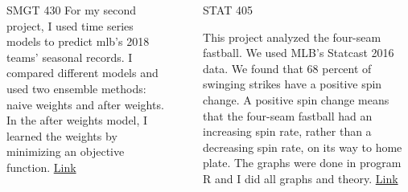 \documentclass[final]{beamer}
\newlength{\sepwid}
\newlength{\onecolwid}
\newlength{\twocolwid}
\begin{document}
\begin{frame}[t]
\begin{columns}[t]
\begin{column}{\onecolwid}
\begin{block}{SMGT 430}
For my second project, I used time series models to predict mlb's 2018 teams' seasonal records. I compared different models and used two ensemble methods: naive weights and after weights. In the after weights model, I learned the weights by minimizing an objective function. 
\href{https://www.dropbox.com/s/0shbgh0q1q4bwfh/smgt-430-record-prediction.pdf?dl=0}
{Link}


\end{block}


\end{column} %

\begin{column}{\sepwid}\end{column} %

\begin{column}{\twocolwid} %

\begin{columns}[t,totalwidth=\twocolwid] %

\begin{column}{\onecolwid}\vspace{-.6in} %


\begin{block}{STAT 405}

This project analyzed the four-seam fastball. We used 
MLB's Statcast 2016 data. We found that 68 percent of 
swinging strikes have a positive spin change. A 
positive spin change means that the four-seam fastball 
had an increasing spin rate, rather than a decreasing 
spin rate, on its way to home plate. The graphs were 
done in program R and I did all graphs and theory.
\href{https://www.dropbox.com/s/mv9xf1h63s1n5ww/stat-405.pdf?dl=0}
{Link}


\end{block}


\end{column} %


\end{columns}
\end{column}
\end{columns}
\end{frame}
\end{document}
